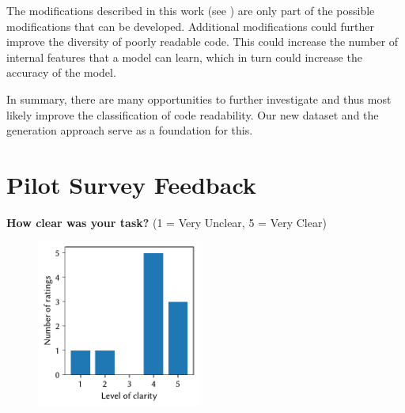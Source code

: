 \documentclass[%
class=scrreprt,
chapterprefix=false,%
open=right,%
twoside=false,%
paper=a4,%
logofile={Logo\_zentral\_farbig\_EN.png},%
thesistype=master,%
UKenglish,%
]{se2thesis}
\renewcommand{\thesection}{\arabic{section}}
\renewcommand{\thechapter}{\arabic{chapter}.0}
\theoremstyle{definition}
\begin{document}
	The modifications described in this work (see ) are only part of the possible modifications that can be developed. Additional modifications could further improve the diversity of poorly readable code. This could increase the number of internal features that a model can learn, which in turn could increase the accuracy of the model.
	
	In summary, there are many opportunities to further investigate and thus most likely improve the classification of code readability. Our new dataset and the generation approach serve as a foundation for this.
	
\authorshipDeclaration
	
\backmatter

\printbibliography
	
	\appendix
	\renewcommand{\thechapter}{\alph{chapter}}
	\renewcommand{\thesection}{\Roman{section}}
	\renewcommand{\thesubsection}{\fnsymbol{subsection}}
	
\pagebreak
\section{Pilot Survey Feedback}\label{appendix:pilot-survey-feedback}

	\textbf{How clear was your task?} (1 = Very Unclear, 5 = Very Clear)
	\begin{figure}[h!]
		\centering
		\includegraphics[width=0.48\textwidth]{img/pilot_survey_task_clearness.pdf}
		\label{fig:pilot-task-clear}
	\end{figure}
	
\end{document}
